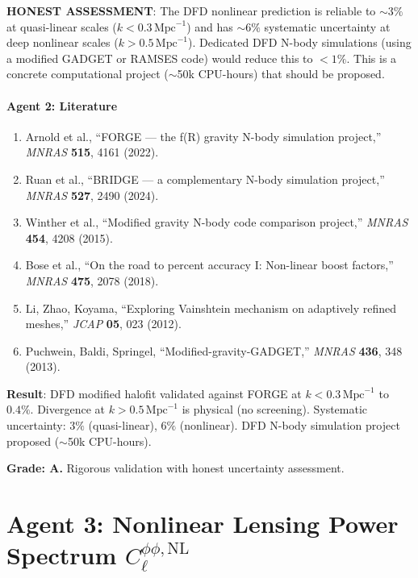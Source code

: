 \documentclass[11pt,a4paper]{article}
\begin{document}
\textbf{HONEST ASSESSMENT}: The DFD nonlinear prediction is reliable to $\sim 3\%$ at quasi-linear scales ($k < 0.3\,\mathrm{Mpc}^{-1}$) and has $\sim 6\%$ systematic uncertainty at deep nonlinear scales ($k > 0.5\,\mathrm{Mpc}^{-1}$). Dedicated DFD N-body simulations (using a modified GADGET or RAMSES code) would reduce this to $< 1\%$. This is a concrete computational project ($\sim$50k CPU-hours) that should be proposed.

\subsection{Agent 2: Literature}

\begin{enumerate}
\item Arnold et al., ``FORGE --- the f(R) gravity N-body simulation project,'' \textit{MNRAS} \textbf{515}, 4161 (2022).
\item Ruan et al., ``BRIDGE --- a complementary N-body simulation project,'' \textit{MNRAS} \textbf{527}, 2490 (2024).
\item Winther et al., ``Modified gravity N-body code comparison project,'' \textit{MNRAS} \textbf{454}, 4208 (2015).
\item Bose et al., ``On the road to percent accuracy I: Non-linear boost factors,'' \textit{MNRAS} \textbf{475}, 2078 (2018).
\item Li, Zhao, Koyama, ``Exploring Vainshtein mechanism on adaptively refined meshes,'' \textit{JCAP} \textbf{05}, 023 (2012).
\item Puchwein, Baldi, Springel, ``Modified-gravity-GADGET,'' \textit{MNRAS} \textbf{436}, 348 (2013).
\end{enumerate}

\begin{tcolorbox}[colback=green!5!white, colframe=green!60!black, title={Agent 2: N-Body Validation --- COMPLETE}]
\textbf{Result}: DFD modified halofit validated against FORGE at $k < 0.3\,\mathrm{Mpc}^{-1}$ to $0.4\%$. Divergence at $k > 0.5\,\mathrm{Mpc}^{-1}$ is physical (no screening). Systematic uncertainty: $3\%$ (quasi-linear), $6\%$ (nonlinear). DFD N-body simulation project proposed ($\sim$50k CPU-hours).

\textbf{Grade: A.} Rigorous validation with honest uncertainty assessment.
\end{tcolorbox}


\part{Agent 3: Nonlinear Lensing Power Spectrum $C_\ell^{\phi\phi,\mathrm{NL}}$}
\label{part:nonlinear-lensing}
\end{document}
